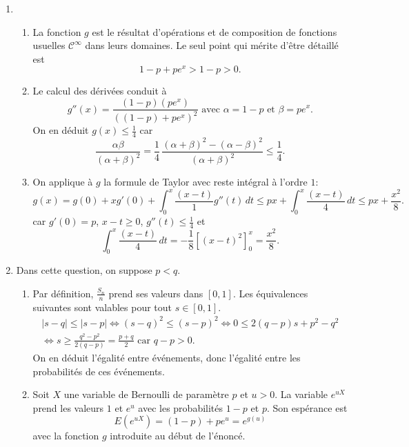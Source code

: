 \begin{enumerate}
 \item 
 \begin{enumerate}
 \item La fonction $g$ est le résultat d'opérations et de composition de fonctions usuelles $\mathcal{C}^{\infty}$ dans leurs domaines. Le seul point qui mérite d'être détaillé est
\[
 1 - p + pe^x > 1- p > 0.
\]

 \item Le calcul des dérivées conduit à 
\[
 g''(x) = \frac{(1-p)(pe^{x})}{\left( (1-p) + pe^x\right)^2 }\text{ avec } \alpha = 1-p \text{ et }\beta = pe^{x}.
\]
On en déduit $g(x) \leq \frac{1}{4}$ car 
\[
 \frac{\alpha \beta}{(\alpha + \beta)^2} = \frac{1}{4}\,\frac{(\alpha + \beta)^2 - (\alpha - \beta)^2}{(\alpha + \beta)^2} \leq \frac{1}{4}.
\]

 \item On applique à $g$ la formule de Taylor avec reste intégral à l'ordre $1$:
\[
 g(x) = g(0) + xg'(0) + \int_0^{x}\frac{(x-t)}{1}g''(t)\,dt
 \leq px + \int_0^{x}\frac{(x-t)}{4}\,dt
 \leq px + \frac{x^2}{8}.
\]
car $g'(0) = p$, $x-t \geq 0$, $g''(t)\leq \frac{1}{4}$ et 
\[
 \int_0^{x}\frac{(x-t)}{4}\,dt = -\frac{1}{8}\left[ (x-t)^2\right]_{0}^{x} = \frac{x^2}{8}. 
\]

\end{enumerate}

 \item Dans cette question, on suppose $p < q$.
 \begin{enumerate}
 \item Par définition, $\frac{S_n}{n}$ prend ses valeurs dans $\left[ 0,1 \right]$. Les équivalences suivantes sont valables pour tout $s\in \left[ 0,1\right]$.
\begin{multline*}
 |s - q|\leq |s-p| \Leftrightarrow(s-q)^2 \leq (s-p)^2
 \Leftrightarrow 0 \leq 2(q-p)s + p^2 - q^2 \\
 \Leftrightarrow s \geq \frac{q^2 - p^2}{2(q-p)} = \frac{p+q}{2} \text{ car } q - p > 0.
\end{multline*}
On en déduit l'égalité entre événements, donc l'égalité entre les probabilités de ces événements.

 \item Soit $X$ une variable de Bernoulli de paramètre $p$ et $u>0$. La variable $e^{uX}$ prend les valeurs $1$ et $e^{u}$ avec les probabilités $1-p$ et $p$. Son espérance est
\[
 E(e^{uX}) = (1-p) + pe^{u} = e^{g(u)}
\]
avec la fonction $g$ introduite au début de l'énoncé.


\end{enumerate}
\end{enumerate}
